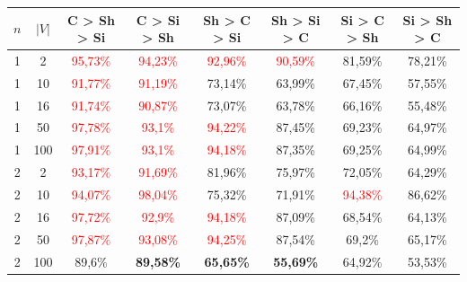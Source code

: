 \begin{table}[ht]
    \centering
    \begin{tabular}{cc|c|c|c|c|c|c}
        \toprule
        $n$ & $|V|$ & \textbf{C > Sh > Si}     & \textbf{C > Si > Sh}     & \textbf{Sh > C > Si}     & \textbf{Sh > Si > C}     & \textbf{Si > C > Sh}      & \textbf{Si > Sh > C}      \\\midrule
        {1} & {2}   & \textcolor{red}{95,73\%} & \textcolor{red}{94,23\%} & \textcolor{red}{92,96\%} & \textcolor{red}{90,59\%} & {81,59\%}                 & {78,21\%}                 \\
        {1} & {10}  & \textcolor{red}{91,77\%} & \textcolor{red}{91,19\%} & {73,14\%}                & {63,99\%}                & {67,45\%}                 & {57,55\%}                 \\
        {1} & {16}  & \textcolor{red}{91,74\%} & \textcolor{red}{90,87\%} & {73,07\%}                & {63,78\%}                & {66,16\%}                 & {55,48\%}                 \\
        {1} & {50}  & \textcolor{red}{97,78\%} & \textcolor{red}{93,1\%}  & \textcolor{red}{94,22\%} & {87,45\%}                & {69,23\%}                 & {64,97\%}                 \\
        {1} & {100} & \textcolor{red}{97,91\%} & \textcolor{red}{93,1\%}  & \textcolor{red}{94,18\%} & {87,35\%}                & {69,25\%}                 & {64,99\%}                 \\
        {2} & {2}   & \textcolor{red}{93,17\%} & \textcolor{red}{91,69\%} & {81,96\%}                & {75,97\%}                & {72,05\%}                 & {64,29\%}                 \\
        {2} & {10}  & \textcolor{red}{94,07\%} & \textcolor{red}{98,04\%} & {75,32\%}                & {71,91\%}                & \textcolor{red}{94,38\%}  & {86,62\%}                 \\
        {2} & {16}  & \textcolor{red}{97,72\%} & \textcolor{red}{92,9\%}  & \textcolor{red}{94,18\%} & {87,09\%}                & {68,54\%}                 & {64,13\%}                 \\
        {2} & {50}  & \textcolor{red}{97,87\%} & \textcolor{red}{93,08\%} & \textcolor{red}{94,25\%} & {87,54\%}                & {69,2\%}                  & {65,17\%}                 \\
        {2} & {100} & {89,6\%}                 & \textbf{89,58\%}         & \textbf{65,65\%}         & \textbf{55,69\%}         & {64,92\%}                 & {53,53\%}                 \\

\end{tabular}
\end{table}
